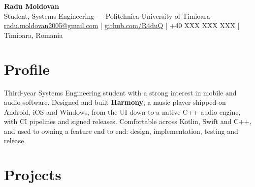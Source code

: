 \documentclass[10pt,a4paper]{article}
\begin{document}
\begin{center}
  {\Huge\bfseries Radu Moldovan}\\[3pt]
  Student, Systems Engineering --- Politehnica University of Timioara\\[3pt]
  \small
  \href{mailto:radu.moldovan2005@gmail.com}{radu.moldovan2005@gmail.com} \;|\;
  \href{https://github.com/R4duQ}{github.com/R4duQ} \;|\;
  +40 XXX XXX XXX \;|\; Timioara, Romania
\end{center}

\section{Profile}
Third-year Systems Engineering student with a strong interest in mobile and audio software. Designed and built \textbf{Harmony}, a
music player shipped on Android, iOS and Windows, from the UI down to a native C++ audio
engine, with CI pipelines and signed releases. Comfortable across Kotlin, Swift and C++,
and used to owning a feature end to end: design, implementation, testing and release.

\section{Projects}
\end{document}
